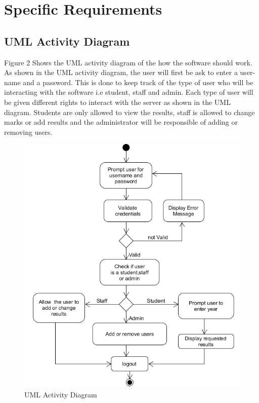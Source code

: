 \documentclass[10pt,onecolumn]{lab}
\begin{document}
\section{Specific Requirements}

\subsection{UML Activity Diagram}

Figure 2 Shows the UML activity diagram of the how the software should work. As shown in the UML activity diagram, the user will first be ask to enter a user-name and a password. This is done to keep track of the type of user who will be interacting with the software i.e student, staff and admin. Each type of user will be given different rights to interact with the server as shown in the UML diagram. Students are only allowed to view the results, staff is allowed to change marks or add results and the administrator will be responsible of adding or removing users.   

\begin{center}
\begin{figure}[h]
\centering
\includegraphics[trim={0cm 0 0 0},clip]{UML-Activity}
\caption{UML Activity Diagram}
\end{figure}
\end{center}
\end{document}
